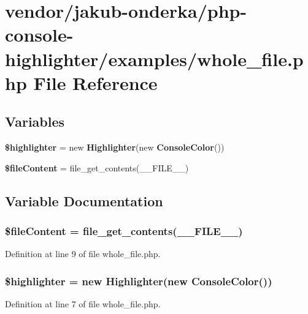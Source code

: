\section{vendor/jakub-\/onderka/php-\/console-\/highlighter/examples/whole\+\_\+file.php File Reference}
\label{whole__file_8php}
\subsection*{Variables}
\begin{DoxyCompactItemize}
\item 
{\bf \$highlighter} = new {\bf Highlighter}(new {\bf Console\+Color}())
\item 
{\bf \$file\+Content} = file\+\_\+get\+\_\+contents(\+\_\+\+\_\+\+F\+I\+L\+E\+\_\+\+\_\+)
\end{DoxyCompactItemize}


\subsection{Variable Documentation}
\subsubsection[{\$file\+Content}]{\setlength{\rightskip}{0pt plus 5cm}\$file\+Content = file\+\_\+get\+\_\+contents(\+\_\+\+\_\+\+F\+I\+L\+E\+\_\+\+\_\+)}\label{whole__file_8php_ad89080bb6e501b4f254f01ee5d24fa2d}


Definition at line 9 of file whole\+\_\+file.\+php.

\subsubsection[{\$highlighter}]{\setlength{\rightskip}{0pt plus 5cm}\$highlighter = new {\bf Highlighter}(new {\bf Console\+Color}())}\label{whole__file_8php_a19caa67352dbd1540a123648430ea09b}


Definition at line 7 of file whole\+\_\+file.\+php.

